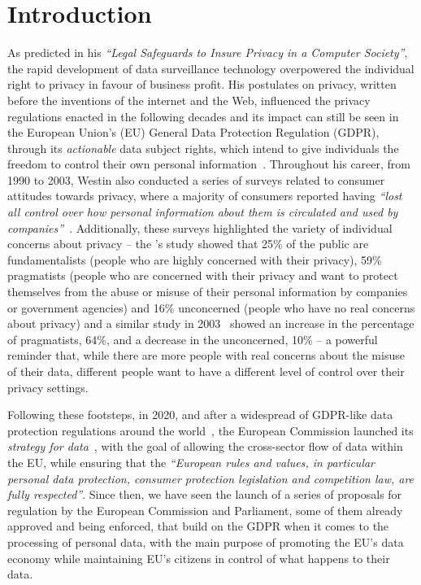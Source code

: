 \chapter{Introduction}
\label{chap:intro}


As \cite{westin_legal_1967} predicted in his \textit{``Legal Safeguards to Insure Privacy in a Computer Society''}, the rapid development of data surveillance technology overpowered the individual right to privacy in favour of business profit.
His postulates on privacy, written before the inventions of the internet and the Web, influenced the privacy regulations enacted in the following decades and its impact can still be seen in the European Union's (EU) General Data Protection Regulation (GDPR), through its \textit{actionable} data subject rights, which intend to give individuals the freedom to control their own personal information~\citep{westin_privacy_1967}.
Throughout his career, from 1990 to 2003, Westin also conducted a series of surveys related to consumer attitudes towards privacy, where a majority of consumers reported having \textit{``lost all control over how personal information about them is circulated and used by companies''}~\citep{kumaraguru_privacy_2005}.
Additionally, these surveys highlighted the variety of individual concerns about privacy -- the \citeyear{westin_equifax-harris_1996}'s study showed that 25\% of the public are fundamentalists (people who are highly concerned with their privacy), 59\% pragmatists (people who are concerned with their privacy and want to protect themselves from the abuse or misuse of their personal information by companies or government agencies) and 16\% unconcerned (people who have no real concerns about privacy) and a similar study in 2003~\citep{taylor_most_2003} showed an increase in the percentage of pragmatists, 64\%, and a decrease in the unconcerned, 10\% -- a powerful reminder that, while there are more people with real concerns about the misuse of their data, different people want to have a different level of control over their privacy settings.

Following these footsteps, in 2020, and after a widespread of GDPR-like data protection regulations around the world~\citep{bradford_brussels_2019}, the European Commission launched its \textit{strategy for data}~\citep{european_commission_communication_2020}, with the goal of allowing the cross-sector flow of data within the EU, while ensuring that the \textit{``European rules and values, in particular personal data protection, consumer protection legislation and competition law, are fully respected''}.
Since then, we have seen the launch of a series of proposals for regulation by the European Commission and Parliament, some of them already approved and being enforced, that build on the GDPR when it comes to the processing of personal data, with the main purpose of promoting the EU's data economy while maintaining EU's citizens in control of what happens to their data.


